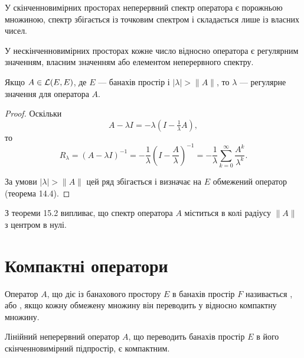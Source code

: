 \begin{remark}
У скінченновимірних просторах
неперервний спектр оператора є порожньою множиною,
спектр збігається із точковим спектром і складається
лише із власних чисел.

У нескінченновимірних просторах
кожне число відносно оператора є регулярним значенням,
власним значенням або елементом неперервного спектру.
\end{remark}

\begin{theorem}
Якщо $A \in \mathcal{L}(E, E)$, де $E$ --- банахів
простір і $|\lambda| > \|A\|$, то $\lambda$ --- регулярне значення для
оператора $A$.
\end{theorem} 

\begin{proof}
Оскільки
\begin{equation*}
    A - \lambda I = - \lambda (I - \tfrac{1}{\lambda} A),
\end{equation*}
то
\begin{equation*}
    R_\lambda = (A - \lambda I)^{-1} =
    -\frac{1}{\lambda} \left( I - \frac{A}{\lambda} \right)^{-1} =
    -\frac{1}{\lambda} \sum_{k = 0}^\infty \frac{A^k}{\lambda^k}.
\end{equation*}

За умови $|\lambda| > \|A\|$ цей ряд збігається і визначає на $E$
обмежений оператор (теорема 14.4). 
\end{proof}

\begin{remark}
З теореми 15.2 випливає, що спектр
оператора $A$ міститься в колі радіусу $\|A\|$ з центром в нулі.
\end{remark}

\section{Компактні оператори}

\begin{definition}
Оператор $A$, що діє із банахового простору
$E$ в банахів простір $F$ називається , або
, якщо кожну обмежену множину він
переводить у відносно компактну множину.
\end{definition}

\begin{example}
Лінійний неперервний оператор $A$, що
переводить банахів простір $E$ в його скінченновимірний
підпростір, є компактним.
\end{example}


